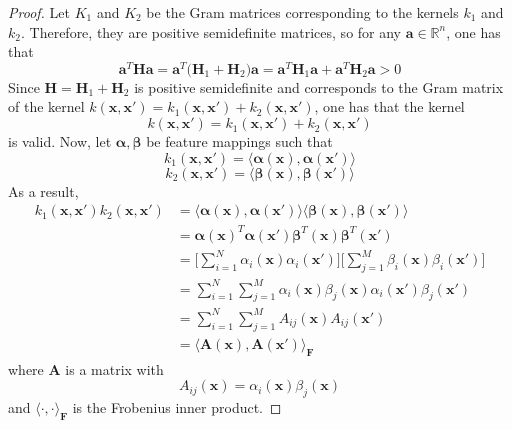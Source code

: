 \begin{proof}
    Let $K_1$ and $K_2$ be the Gram matrices corresponding to the 
    kernels $k_1$ and $k_2$. Therefore, they are positive semidefinite matrices, so
    for any $\mathbf{a} \in \mathbb{R}^n$, one has that
    \[
        \mathbf{a}^T\mathbf{H}\mathbf{a}
        = \mathbf{a}^T\big(\mathbf{H}_1 + \mathbf{H}_2\big)\mathbf{a}
        = \mathbf{a}^T \mathbf{H}_1 \mathbf{a} + \mathbf{a}^T \mathbf{H}_2 \mathbf{a} > 0
    \] 
    Since $\mathbf{H} = \mathbf{H}_1 + \mathbf{H}_2$ is positive semidefinite
    and corresponds to the Gram matrix of the 
    kernel $k(\mathbf{x}, \mathbf{x}') = k_1(\mathbf{x}, \mathbf{x'}) + 
    k_2(\mathbf{x}, \mathbf{x}')$, one has that the kernel
    \begin{equation}\label{eq:6.17}\tag{6.17}
        k(\mathbf{x}, \mathbf{x}') = k_1(\mathbf{x}, \mathbf{x}') + k_2(\mathbf{x}, \mathbf{x}')
    \end{equation}
    is valid. Now, let $\bm{\alpha}, \bm{\beta}$ be feature mappings such that
    \[
        k_1(\mathbf{x}, \mathbf{x}') 
        = \langle \bm{\alpha}(\mathbf{x}), \bm{\alpha}(\mathbf{x}') \rangle 
    \] 
    \[
        k_2(\mathbf{x}, \mathbf{x}') 
        = \langle \bm{\beta}(\mathbf{x}), \bm{\beta}(\mathbf{x}') \rangle 
    \]
    As a result,
    \begin{align*}
        k_1(\mathbf{x}, \mathbf{x}') k_2(\mathbf{x}, \mathbf{x}')
        &= \langle \bm{\alpha}(\mathbf{x}), \bm{\alpha}(\mathbf{x}') \rangle 
        \langle \bm{\beta}(\mathbf{x}), \bm{\beta}(\mathbf{x}') \rangle \\
        &= \bm{\alpha}(\mathbf{x})^T \bm{\alpha}(\mathbf{x}')
        \bm{\beta}^T(\mathbf{x}) \bm{\beta}^T(\mathbf{x}') \\
        &= \bigg[\sum_{i=1}^{N} \alpha_i(\mathbf{x}) \alpha_i(\mathbf{x}')\bigg]
        \bigg[\sum_{j=1}^{M} \beta_i(\mathbf{x}) \beta_i(\mathbf{x}')\bigg] \\
        &= \sum_{i=1}^{N} \sum_{j=1}^{M} \alpha_i(\mathbf{x}) \beta_j(\mathbf{x})
        \alpha_i(\mathbf{x}') \beta_j(\mathbf{x}') \tag{*}\\
        &= \sum_{i=1}^{N} \sum_{j=1}^{M}  A_{ij}(\mathbf{x}) A_{ij}(\mathbf{x}') \\
        &= \langle \mathbf{A}(\mathbf{x}), \mathbf{A}(\mathbf{x'}) \rangle_\mathbf{F}
    \end{align*}
    where $\mathbf{A}$ is a matrix with
    \[
        A_{ij}(\mathbf{x}) = \alpha_i(\mathbf{x}) \beta_j(\mathbf{x})
    \] 
    and $\langle \cdot, \cdot \rangle_\mathbf{F}$ is the Frobenius inner product.

\end{proof}
